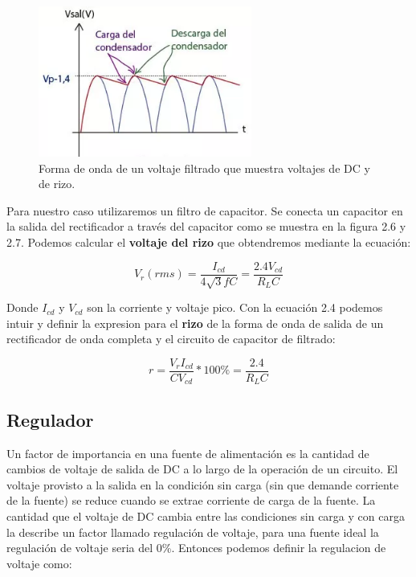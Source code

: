 \begin{figure}[H]
\centering
\includegraphics[width=7cm]{capitulo3/figs/filtro.png}
\caption{ Forma de onda de un voltaje filtrado que muestra voltajes de DC y de rizo.}
\end{figure}

Para nuestro caso utilizaremos un filtro de capacitor. Se conecta un capacitor en la salida del rectificador a través del capacitor como se muestra en la figura 2.6 y 2.7. Podemos calcular el \textbf{voltaje del rizo} que obtendremos mediante la ecuación:

\begin{equation}
V_{r}(rms)=\dfrac{I_{cd}}{4\sqrt{3}fC}=\dfrac{2.4V_{cd}}{R_{L}C}
\end{equation}

Donde $I_{cd}$ y $V_{cd}$ son la corriente y voltaje pico. Con la ecuación 2.4 podemos intuir y definir la expresion para el \textbf{rizo} de la forma de onda de salida de un rectificador de onda completa y el circuito de capacitor de filtrado:

\begin{equation}
r=\dfrac{V_{r}I_{cd}}{CV_{cd}}*100\%=\dfrac{2.4}{R_{L}C}
\end{equation}

\subsection{Regulador}

Un factor de importancia en una fuente de alimentación es la cantidad de cambios de voltaje de salida de DC a lo largo de la operación de un circuito. El voltaje provisto a la salida en la condición sin carga (sin que demande corriente de la fuente) se reduce cuando se extrae corriente de carga de la fuente. La cantidad que el voltaje de DC cambia entre las condiciones sin carga y con carga la describe un factor llamado regulación de voltaje, para una fuente ideal la regulación de voltaje seria del 0\%. Entonces podemos definir la regulacion de voltaje como:
 

